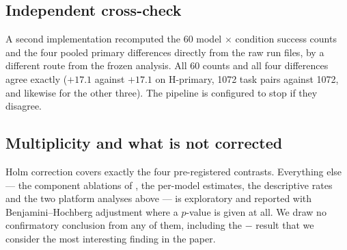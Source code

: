 \subsection{Independent cross-check}

A second implementation recomputed the 60 model $\times$ condition success counts and the four pooled primary
differences directly from the raw run files, by a different route from the frozen analysis. All 60 counts and all
four differences agree exactly ($+17.1$ against $+17.1$ on H-primary, 1072 task pairs against 1072, and likewise
for the other three). The pipeline is configured to stop if they disagree.

\subsection{Multiplicity and what is not corrected}

Holm correction covers exactly the four pre-registered contrasts. Everything else --- the component ablations of
, the per-model estimates, the descriptive rates and the two platform analyses above --- is
exploratory and reported with Benjamini--Hochberg adjustment where a $p$-value is given at all. We draw no
confirmatory conclusion from any of them, including the  $-$  result that we consider the
most interesting finding in the paper.
